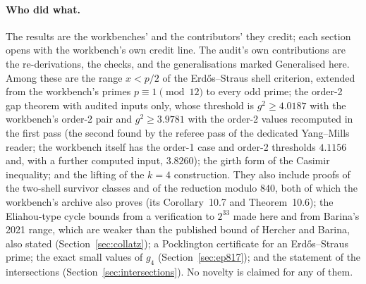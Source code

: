 \paragraph{Who did what.}
The results are the workbenches' and the contributors' they credit; each section opens with the workbench's own credit line.
The audit's own contributions are the re-derivations, the checks, and the generalisations marked \textsf{Generalised here}. Among these are the range $x<p/2$ of the Erdős--Straus shell criterion, extended from the workbench's primes $p\equiv1\pmod{12}$ to every odd prime; the order-2 gap theorem with audited inputs only, whose threshold is $g^2\ge4.0187$ with the workbench's order-2 pair and $g^2\ge3.9781$ with the order-2 values recomputed in the first pass (the second found by the referee pass of the dedicated Yang--Mills reader; the workbench itself has the order-1 case and order-2 thresholds $4.1156$ and, with a further computed input, $3.8260$); the girth form of the Casimir inequality; and the lifting of the $k=4$ construction. They also include proofs of the two-shell survivor classes and of the reduction modulo $840$, both of which the workbench's archive also proves (its Corollary~10.7 and Theorem~10.6); the Eliahou-type cycle bounds from a verification to $2^{33}$ made here and from Barina's 2021 range, which are weaker than the published bound of Hercher and Barina, also stated (Section~\ref{sec:collatz}); a Pocklington certificate for an Erdős--Straus prime; the exact small values of $g_4$ (Section~\ref{sec:ep817}); and the statement of the intersections (Section~\ref{sec:intersections}). No novelty is claimed for any of them.


